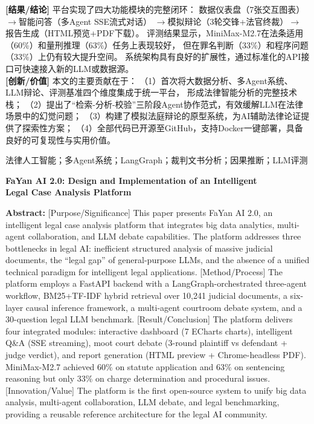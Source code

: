 \documentclass[12pt,a4paper,twoside]{ctexart}
\begin{document}
\noindent
{\bfseries [结果/结论]} 平台实现了四大功能模块的完整闭环：
数据仪表盘（7张交互图表）$\rightarrow$智能问答（多Agent SSE流式对话）
$\rightarrow$模拟辩论（3轮交锋+法官终裁）$\rightarrow$报告生成（HTML预览+PDF下载）。
评测结果显示，MiniMax-M2.7在法条适用（60\%）和量刑推理（63\%）任务上表现较好，
但在罪名判断（33\%）和程序问题（33\%）上仍有较大提升空间。
系统架构具有良好的扩展性，通过标准化的API接口可快速接入新的LLM或数据源。\\[4pt]

\noindent
{\bfseries [创新/价值]} 本文的主要贡献在于：
（1）首次将大数据分析、多Agent系统、LLM辩论、评测基准四个维度集成于统一平台，
形成法律智能分析的完整技术栈；
（2）提出了``检索-分析-校验''三阶段Agent协作范式，有效缓解LLM在法律场景中的幻觉问题；
（3）构建了模拟法庭辩论的原型系统，为AI辅助法律论证提供了探索性方案；
（4）全部代码已开源至GitHub，支持Docker一键部署，具备良好的可复现性与实用价值。

\vspace{12pt}
法律人工智能；多Agent系统；LangGraph；裁判文书分析；因果推断；LLM评测

\vspace{6pt}
\begin{center}
{\bfseries\fontsize{12pt}{16pt}\selectfont
FaYan AI 2.0: Design and Implementation of an Intelligent\\[4pt]
Legal Case Analysis Platform}
\end{center}

\noindent
{\bfseries Abstract:} [Purpose/Significance] This paper presents FaYan AI 2.0,
an intelligent legal case analysis platform that integrates big data analytics,
multi-agent collaboration, and LLM debate capabilities. The platform addresses
three bottlenecks in legal AI: inefficient structured analysis of massive
judicial documents, the ``legal gap'' of general-purpose LLMs, and the
absence of a unified technical paradigm for intelligent legal applications.
[Method/Process] The platform employs a FastAPI backend with a LangGraph-orchestrated
three-agent workflow, BM25+TF-IDF hybrid retrieval over 10,241 judicial documents,
a six-layer causal inference framework, a multi-agent courtroom debate system,
and a 30-question legal LLM benchmark. [Result/Conclusion] The platform delivers
four integrated modules: interactive dashboard (7 ECharts charts), intelligent
Q\&A (SSE streaming), moot court debate (3-round plaintiff vs defendant + judge
verdict), and report generation (HTML preview + Chrome-headless PDF).
MiniMax-M2.7 achieved 60\% on statute application and 63\% on sentencing
reasoning but only 33\% on charge determination and procedural issues.
[Innovation/Value] The platform is the first open-source system to unify big data
analysis, multi-agent collaboration, LLM debate, and legal benchmarking,
providing a reusable reference architecture for the legal AI community.
\end{document}
